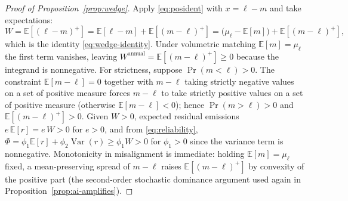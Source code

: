 \documentclass[a4paper,fleqn,longmktitle]{cas-sc}
\theoremstyle{plain}
\theoremstyle{definition}
\newcommand{\E}{\mathbb{E}}
\newcommand{\Var}{\operatorname{Var}}
\newcommand{\pos}[1]{\left(#1\right)^{+}}
\begin{document}
\begin{proof}[Proof of Proposition~\ref{prop:wedge}]
Apply \eqref{eq:posident} with $x=\ell-m$ and take expectations:
\begin{equation*}
    W=\E\!\left[\pos{\ell-m}\right]=\E[\ell-m]+\E\!\left[\pos{m-\ell}\right]=\big(\mu_\ell-\E[m]\big)+\E\!\left[\pos{m-\ell}\right],
\end{equation*}
which is the identity \eqref{eq:wedge-identity}. Under volumetric matching $\E[m]=\mu_\ell$ the first term vanishes, leaving $W^{\mathrm{annual}}=\E[\pos{m-\ell}]\ge 0$ because the integrand is nonnegative. For strictness, suppose $\Pr(m<\ell)>0$. The constraint $\E[m-\ell]=0$ together with $m-\ell$ taking strictly negative values on a set of positive measure forces $m-\ell$ to take strictly positive values on a set of positive measure (otherwise $\E[m-\ell]<0$); hence $\Pr(m>\ell)>0$ and $\E[\pos{m-\ell}]>0$. Given $W>0$, expected residual emissions $e\,\E[r]=e\,W>0$ for $e>0$, and from \eqref{eq:reliability}, $\Phi=\phi_1\E[r]+\phi_2\Var(r)\ge\phi_1 W>0$ for $\phi_1>0$ since the variance term is nonnegative. Monotonicity in misalignment is immediate: holding $\E[m]=\mu_\ell$ fixed, a mean-preserving spread of $m-\ell$ raises $\E[\pos{m-\ell}]$ by convexity of the positive part (the second-order stochastic dominance argument used again in Proposition~\ref{prop:ai-amplifies}).
\end{proof}
\end{document}
